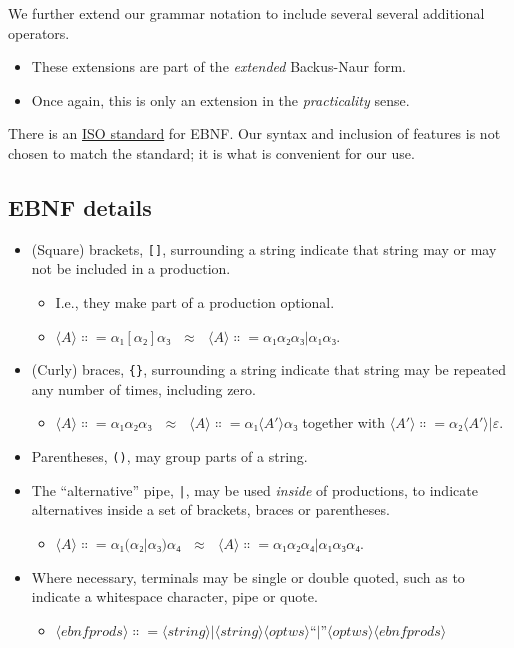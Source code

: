 \documentclass[11pt]{article}
\theoremstyle{definition}
\begin{document}
We further extend our grammar notation to include several
several additional operators.
\begin{itemize}
\item These extensions are part of the \emph{extended} Backus-Naur form.
\item Once again, this is only an extension in the \emph{practicality} sense.
\end{itemize}

There is an \href{https://www.iso.org/standard/26153.html}{ISO standard} for EBNF.
Our syntax and inclusion of features is
not chosen to match the standard;
it is what is convenient for our use.

\subsection{EBNF details}
\label{sec:org7eba75c}

\begin{itemize}
\item (Square) brackets, \texttt{[]}, surrounding a string
indicate that string may or may not be included in a production.
\begin{itemize}
\item I.e., they make part of a production optional.
\item \(⟨A⟩ ∷= α₁ [ α₂ ] α₃ \ \ \ ≈ \ \ \ ⟨A⟩ ∷= α₁ α₂ α₃ | α₁ α₃\).
\end{itemize}
\item (Curly) braces, \texttt{\{\}}, surrounding a string
indicate that string may be repeated any number of times,
including zero.
\begin{itemize}
\item \(⟨A⟩ ∷= α₁ { α₂ } α₃ \ \ \ ≈ \ \ \ ⟨A⟩ ∷= α₁ ⟨A′⟩ α₃\) together
with \(⟨A′⟩ ∷= α₂ ⟨A′⟩ | ε\).
\end{itemize}
\item Parentheses, \texttt{()}, may group parts of a string.
\item The “alternative” pipe, \texttt{|}, may be used \emph{inside} of productions,
to indicate alternatives inside a set of brackets, braces
or parentheses.
\begin{itemize}
\item \(⟨A⟩ ∷= α₁ (α₂ | α₃) α₄ \ \ \ ≈ \ \ \ ⟨A⟩ ∷= α₁ α₂ α₄ | α₁ α₃ α₄\).
\end{itemize}
\item Where necessary, terminals may be single or double quoted,
such as to indicate a whitespace character, pipe or quote.
\begin{itemize}
\item \(⟨ebnfprods⟩ ∷= ⟨string⟩ | ⟨string⟩ ⟨optws⟩ “|” ⟨optws⟩ ⟨ebnfprods⟩\)
\end{itemize}
\end{itemize}
\end{document}
